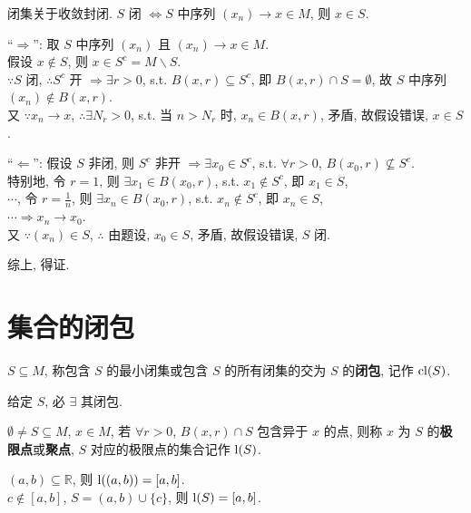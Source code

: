 \documentclass{note}
\begin{document}
\begin{thm}[(课本定理 12.2)]
    闭集关于收敛封闭. $S$ 闭 $\Longleftrightarrow S$ 中序列 $(x_n)\rightarrow x\in M$, 则 $x\in S$.
\end{thm}
\begin{pf}
    ``$\Longrightarrow$'': 取 $S$ 中序列 $(x_n)$ 且 $(x_n)\rightarrow x\in M$.\\
    假设 $x\notin S$, 则 $x\in S^c=M\backslash S$.\\
    $\because S$ 闭, $\therefore S^c$ 开 $\Longrightarrow\exists r>0$, s.t. $B(x,r)\subseteq S^c$, 即 $B(x,r)\cap S=\emptyset$, 故 $S$ 中序列 $(x_n)\notin B(x,r)$.\\
    又 $\because x_n\rightarrow x$, $\therefore\exists N_r>0$, s.t. 当 $n>N_r$ 时, $x_n\in B(x,r)$, 矛盾, 故假设错误, $x\in S$.

    ``$\Longleftarrow$'': 假设 $S$ 非闭, 则 $S^c$ 非开
    $\Longrightarrow\exists x_0\in S^c$, s.t. $\forall r>0$, $B(x_0,r)\nsubseteq S^c$.\\
    特别地, 令 $r=1$, 则 $\exists x_1\in B(x_0,r)$, s.t. $x_1\notin S^c$, 即 $x_1\in S$,\\
    $\cdots$, 令 $r=\frac{1}{n}$, 则 $\exists x_n\in B(x_0,r)$, s.t. $x_n\notin S^c$, 即 $x_n\in S$,\\
    $\cdots\Longrightarrow x_n\rightarrow x_0$.\\
    又 $\because(x_n)\in S$, $\therefore$ 由题设, $x_0\in S$, 矛盾, 故假设错误, $S$ 闭.

    综上, 得证.
\end{pf}

\section{集合的闭包}
\begin{df}[闭包]
    $S\subseteq M$, 称包含 $S$ 的最小闭集或包含 $S$ 的所有闭集的交为 $S$ 的\textbf{闭包}, 记作 $\operatorname{cl}(S)$.
\end{df}

给定 $S$, 必 $\exists$ 其闭包.

\begin{df}[极限点(/聚点)]
    $\emptyset\neq S\subseteq M$, $x\in M$, 若 $\forall r>0$, $B(x,r)\cap S$ 包含异于 $x$ 的点, 则称 $x$ 为 $S$ 的\textbf{极限点}或\textbf{聚点}, $S$ 对应的极限点的集合记作 $\operatorname{l}(S)$.
\end{df}

\begin{eg}
    $(a,b)\subseteq\mathbb{R}$, 则 $\operatorname{l}((a,b))=[a,b]$.\\
    $c\notin[a,b]$, $S=(a,b)\cup\{c\}$, 则 $\operatorname{l}(S)=[a,b]$.
\end{eg}
\end{document}
